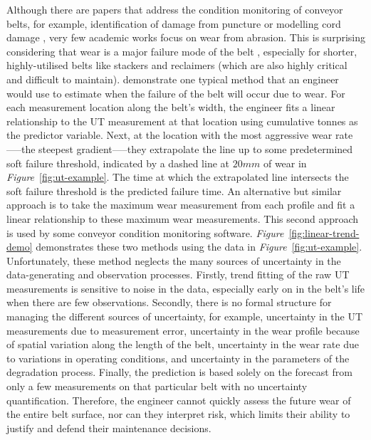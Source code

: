 Although there are papers that address the condition monitoring of conveyor belts, for example, identification of damage from puncture or modelling cord damage \citep{bortnowski_2022}, very few academic works focus on wear from abrasion. This is surprising considering that wear is a major failure mode of the belt \citep{bortnowski_2022}, especially for shorter, highly-utilised belts like stackers and reclaimers (which are also highly critical and difficult to maintain). \citet{webb_2020} demonstrate one typical method that an engineer would use to estimate when the failure of the belt will occur due to wear. For each measurement location along the belt's width, the engineer fits a linear relationship to the UT measurement at that location using cumulative tonnes as the predictor variable. Next, at the location with the most aggressive wear rate—--the steepest gradient—--they extrapolate the line up to some predetermined soft failure threshold, indicated by a dashed line at $20mm$ of wear in \textit{Figure}~\ref{fig:ut-example}. The time at which the extrapolated line intersects the soft failure threshold is the predicted failure time. An alternative but similar approach is to take the maximum wear measurement from each profile and fit a linear relationship to these maximum wear measurements. This second approach is used by some conveyor condition monitoring software. \textit{Figure}~\ref{fig:linear-trend-demo} demonstrates these two methods using the data in \textit{Figure}~\ref{fig:ut-example}. Unfortunately, these method neglects the many sources of uncertainty in the data-generating and observation processes. Firstly, trend fitting of the raw UT measurements is sensitive to noise in the data, especially early on in the belt's life when there are few observations. Secondly, there is no formal structure for managing the different sources of uncertainty, for example, uncertainty in the UT measurements due to measurement error, uncertainty in the wear profile because of spatial variation along the length of the belt, uncertainty in the wear rate due to variations in operating conditions, and uncertainty in the parameters of the degradation process. Finally, the prediction is based solely on the forecast from only a few measurements on that particular belt with no uncertainty quantification. Therefore, the engineer cannot quickly assess the future wear of the entire belt surface, nor can they interpret risk, which limits their ability to justify and defend their maintenance decisions.

